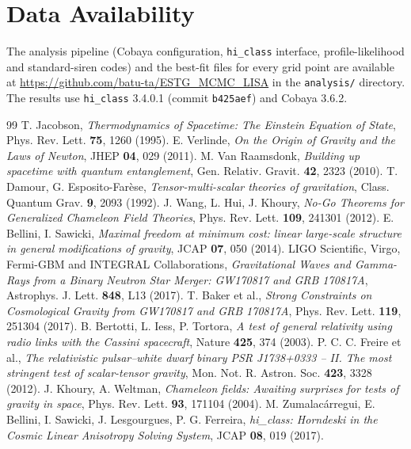 \documentclass[11pt,a4paper]{article}
\begin{document}
\section*{Data Availability}
The analysis pipeline (Cobaya configuration, \texttt{hi\_class} interface, profile-likelihood and standard-siren codes) and the best-fit files for every grid point are available at \url{https://github.com/batu-ta/ESTG_MCMC_LISA} in the \texttt{analysis/} directory. The results use \texttt{hi\_class} 3.4.0.1 (commit \texttt{b425aef}) and Cobaya 3.6.2.

\begin{thebibliography}{99}
 T. Jacobson, \textit{Thermodynamics of Spacetime: The Einstein Equation of State}, Phys. Rev. Lett. \textbf{75}, 1260 (1995).
 E. Verlinde, \textit{On the Origin of Gravity and the Laws of Newton}, JHEP \textbf{04}, 029 (2011).
 M. Van Raamsdonk, \textit{Building up spacetime with quantum entanglement}, Gen. Relativ. Gravit. \textbf{42}, 2323 (2010).
 T. Damour, G. Esposito-Farèse, \textit{Tensor-multi-scalar theories of gravitation}, Class. Quantum Grav. \textbf{9}, 2093 (1992).
 J. Wang, L. Hui, J. Khoury, \textit{No-Go Theorems for Generalized Chameleon Field Theories}, Phys. Rev. Lett. \textbf{109}, 241301 (2012).
 E. Bellini, I. Sawicki, \textit{Maximal freedom at minimum cost: linear large-scale structure in general modifications of gravity}, JCAP \textbf{07}, 050 (2014).
 LIGO Scientific, Virgo, Fermi-GBM and INTEGRAL Collaborations, \textit{Gravitational Waves and Gamma-Rays from a Binary Neutron Star Merger: GW170817 and GRB 170817A}, Astrophys. J. Lett. \textbf{848}, L13 (2017).
 T. Baker et al., \textit{Strong Constraints on Cosmological Gravity from GW170817 and GRB 170817A}, Phys. Rev. Lett. \textbf{119}, 251304 (2017).
 B. Bertotti, L. Iess, P. Tortora, \textit{A test of general relativity using radio links with the Cassini spacecraft}, Nature \textbf{425}, 374 (2003).
 P. C. C. Freire et al., \textit{The relativistic pulsar--white dwarf binary PSR J1738+0333 -- II. The most stringent test of scalar-tensor gravity}, Mon. Not. R. Astron. Soc. \textbf{423}, 3328 (2012).
 J. Khoury, A. Weltman, \textit{Chameleon fields: Awaiting surprises for tests of gravity in space}, Phys. Rev. Lett. \textbf{93}, 171104 (2004).
 M. Zumalacárregui, E. Bellini, I. Sawicki, J. Lesgourgues, P. G. Ferreira, \textit{hi\_class: Horndeski in the Cosmic Linear Anisotropy Solving System}, JCAP \textbf{08}, 019 (2017).

\end{thebibliography}
\end{document}
